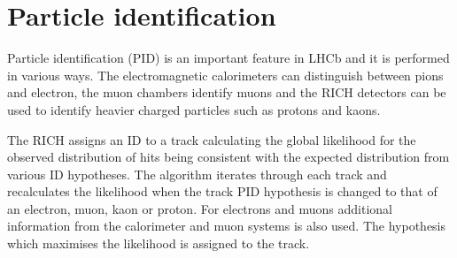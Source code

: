 \section{Particle identification}
\label{sec:PID_perf}

Particle identification (PID) is an important feature in LHCb and it is performed in various ways.
The electromagnetic calorimeters can distinguish between pions and electron, the muon chambers
identify muons and the RICH detectors can be used to identify 
heavier charged particles such as protons and kaons.

The RICH assigns an ID to a track calculating the global likelihood for the observed distribution 
of hits being consistent with the expected distribution from various ID hypotheses.
The algorithm iterates through each track and recalculates the likelihood when the track PID hypothesis
is changed to that of an electron, muon, kaon or proton. For electrons and muons additional information
from the calorimeter and muon systems is also used. The hypothesis which maximises the likelihood
is assigned to the track.


